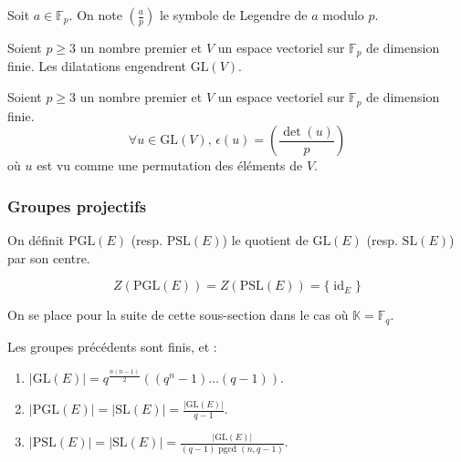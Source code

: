 
  \begin{notation}
    Soit $a \in \mathbb{F}_p$. On note $\left( \frac{a}{p} \right)$ le symbole de Legendre de $a$ modulo $p$.
  \end{notation}

  \begin{lemma}
    Soient $p \geq 3$ un nombre premier et $V$ un espace vectoriel sur $\mathbb{F}_p$ de dimension finie. Les dilatations engendrent $\mathrm{GL}(V)$.
  \end{lemma}


  \begin{application}
    Soient $p \geq 3$ un nombre premier et $V$ un espace vectoriel sur $\mathbb{F}_p$ de dimension finie.
    \[ \forall u \in \mathrm{GL}(V), \, \epsilon(u) = \left( \frac{\det(u)}{p} \right) \]
    où $u$ est vu comme une permutation des éléments de $V$.
  \end{application}

  \subsubsection{Groupes projectifs}


  \begin{definition}
    On définit $\mathrm{PGL}(E)$ (resp. $\mathrm{PSL}(E)$) le quotient de $\mathrm{GL}(E)$ (resp. $\mathrm{SL}(E)$) par son centre.
  \end{definition}

  \begin{proposition}
    \[ Z(\mathrm{PGL}(E)) = Z(\mathrm{PSL}(E)) = \{ \operatorname{id}_E \} \]
  \end{proposition}


  On se place pour la suite de cette sous-section dans le cas où $\mathbb{K} = \mathbb{F}_q$.

  \begin{proposition}
    Les groupes précédents sont finis, et :
    \begin{enumerate}[label=(\roman*)]
      \item $|\mathrm{GL}(E)| = q^{\frac{n(n-1)}{2}}((q^n-1) \dots (q-1))$.
      \item $|\mathrm{PGL}(E)| = |\mathrm{SL}(E)| = \frac{|\mathrm{GL}(E)|}{q-1}$.
      \item $|\mathrm{PSL}(E)| = |\mathrm{SL}(E)| = \frac{|\mathrm{GL}(E)|}{(q-1)\operatorname{pgcd}(n,q-1)}$.
    \end{enumerate}
  \end{proposition}

